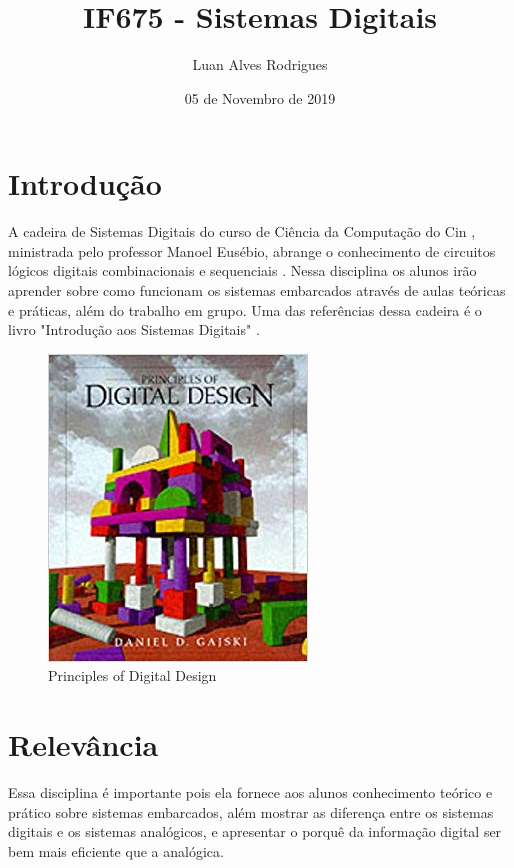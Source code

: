 \documentclass[a4paper,10pt]{extarticle}
\title{IF675 - Sistemas Digitais}
\author{Luan Alves Rodrigues }
\date{05 de Novembro de 2019}
\begin{document}
\maketitle

\section{Introdução}
A cadeira de Sistemas Digitais do curso de Ciência da Computação do Cin , ministrada pelo professor Manoel Eusébio, abrange o conhecimento de circuitos lógicos digitais combinacionais e sequenciais \citep{CinWiki}\citep{SiteDisciplina}. Nessa disciplina os alunos irão aprender sobre como funcionam os sistemas embarcados através de aulas teóricas e práticas, além do trabalho em grupo. Uma das referências dessa cadeira é o livro "Introdução aos Sistemas Digitais" \citep{Livro}.

\begin{figure}[h!]
\centering
\includegraphics[scale=0.7]{1}
\caption{Principles of Digital Design\citep{Imagem}}
\label{fig:1}
\end{figure}


\section{Relevância}
Essa disciplina é importante pois ela fornece aos alunos conhecimento teórico e prático sobre sistemas embarcados, além mostrar as diferença entre os sistemas digitais e os sistemas analógicos, e apresentar o porquê da informação digital ser bem mais eficiente que a analógica.
\end{document}
